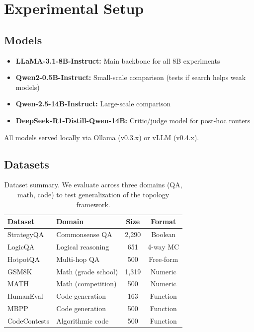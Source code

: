 \section{Experimental Setup}

\subsection{Models}

\begin{itemize}
\item \textbf{LLaMA-3.1-8B-Instruct:} Main backbone for all 8B experiments
\item \textbf{Qwen2-0.5B-Instruct:} Small-scale comparison (tests if search helps weak models)
\item \textbf{Qwen-2.5-14B-Instruct:} Large-scale comparison
\item \textbf{DeepSeek-R1-Distill-Qwen-14B:} Critic/judge model for post-hoc routers
\end{itemize}

All models served locally via Ollama (v0.3.x) or vLLM (v0.4.x).

\subsection{Datasets}

\begin{table}[ht]
\centering
\small
\begin{tabular}{llcc}
\toprule
\textbf{Dataset} & \textbf{Domain} & \textbf{Size} & \textbf{Format} \\
\midrule
StrategyQA & Commonsense QA & 2,290 & Boolean \\
LogicQA & Logical reasoning & 651 & 4-way MC \\
HotpotQA & Multi-hop QA & 500 & Free-form \\
GSM8K & Math (grade school) & 1,319 & Numeric \\
MATH & Math (competition) & 500 & Numeric \\
HumanEval & Code generation & 163 & Function \\
MBPP & Code generation & 500 & Function \\
CodeContests & Algorithmic code & 500 & Function \\
\bottomrule
\end{tabular}
\caption{Dataset summary. We evaluate across three domains (QA, math, code) to test generalization of the topology framework.}
\label{tab:datasets}
\end{table}

